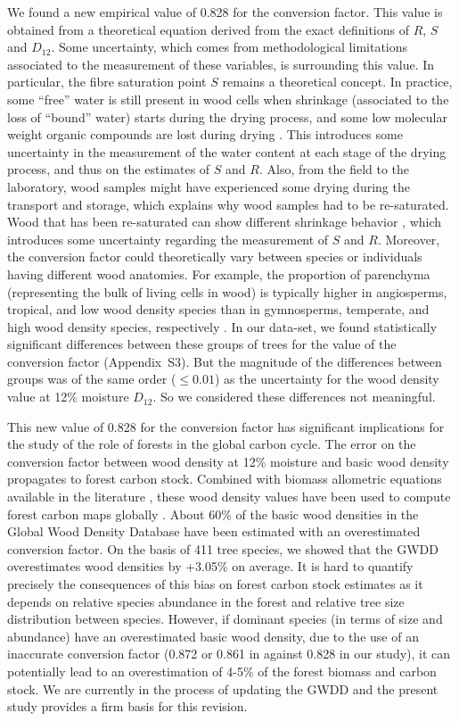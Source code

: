 \documentclass[a4paper, 12pt, leqno, dvipsnames]{article}\usepackage[]{graphicx}\usepackage[]{color}
\begin{document}
We found a new empirical value of 0.828 for the conversion factor. This value is obtained from a theoretical equation derived from the exact definitions of $R$, $S$ and $D_{12}$. Some uncertainty, which comes from methodological limitations associated to the measurement of these variables, is surrounding this value. In particular, the fibre saturation point $S$ remains a theoretical concept. In practice, some ``free'' water is still present in wood cells when shrinkage (associated to the loss of ``bound'' water) starts during the drying process, and some low molecular weight organic compounds are lost during drying \citep{Rosner2009}. This introduces some uncertainty in the measurement of the water content at each stage of the drying process, and thus on the estimates of $S$ and $R$. Also, from the field to the laboratory, wood samples might have experienced some drying during the transport and storage, which explains why wood samples had to be re-saturated. Wood that has been re-saturated can show different shrinkage behavior \citep{Glass2010}, which introduces some uncertainty regarding the measurement of $S$ and $R$. Moreover, the conversion factor could theoretically vary between species or individuals having different wood anatomies. For example, the proportion of parenchyma (representing the bulk of living cells in wood) is typically higher in angiosperms, tropical, and low wood density species than in gymnosperms, temperate, and high wood density species, respectively \citep{Morris2016}. In our data-set, we found statistically significant differences between these groups of trees for the value of the conversion factor (Appendix~S3). But the magnitude of the differences between groups was of the same order ($\leq 0.01$) as the uncertainty for the wood density value at 12\% moisture $D_{12}$. So we considered these differences not meaningful.

This new value of 0.828 for the conversion factor has significant implications for the study of the role of forests in the global carbon cycle. The error on the conversion factor between wood density at 12\% moisture and basic wood density propagates to forest carbon stock. Combined with biomass allometric equations available in the literature \citep{Chave2005, Chave2014, Vieilledent2012}, these wood density values have been used to compute forest carbon maps globally \citep{Saatchi2011, Baccini2012, Avitabile2016, Baccini2017}. About 60\% of the basic wood densities in the Global Wood Density Database have been estimated with an overestimated conversion factor. On the basis of 411 tree species, we showed that the GWDD overestimates wood densities by +3.05\% on average. It is hard to quantify precisely the consequences of this bias on forest carbon stock estimates as it depends on relative species abundance in the forest and relative tree size distribution between species. However, if dominant species (in terms of size and abundance) have an overestimated basic wood density, due to the use of an inaccurate conversion factor (0.872 or 0.861 in \citet{Chave2006, Chave2009} against 0.828 in our study), it can potentially lead to an overestimation of 4-5\% of the forest biomass and carbon stock. We are currently in the process of updating the GWDD and the present study provides a firm basis for this revision.
\end{document}
